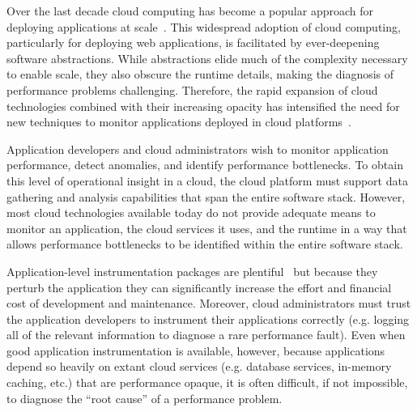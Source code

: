 Over the last decade cloud computing has become a popular approach for
deploying applications at
scale~\cite{Antonopoulos:2010:CCP:1855007,Pinheiro:2014:ACC:2618168.2618188}.
This widespread adoption of cloud computing, particularly for deploying web
applications, is facilitated by ever-deepening software abstractions.  While
abstractions elide much of 
the complexity necessary to enable scale, they also obscure
the runtime details, making the diagnosis of performance
problems challenging.  Therefore, the rapid expansion of cloud technologies
combined with their increasing opacity has intensified the need for new
techniques to monitor applications deployed in cloud
platforms~\cite{DaCunhaRodrigues:2016:MCC:2851613.2851619}. 

Application developers and cloud administrators wish to monitor
application performance, detect anomalies, and identify performance 
bottlenecks. To
obtain this level of operational insight in a cloud,
the cloud platform must support data gathering and analysis capabilities that
span the entire software stack.  However, most cloud technologies
available today do not provide adequate means to monitor an application, the cloud
services it uses, and the runtime in a way that allows performance bottlenecks
to be identified within the entire software stack.

Application-level instrumentation packages are
plentiful~\cite{newrelic,datadog,dynatrace} but because they perturb the
application they can significantly increase the
effort and financial cost of development and maintenance.  Moreover, cloud
administrators must trust the application developers to instrument their
applications correctly (e.g. logging all of the relevant 
information to diagnose a rare performance fault).  Even when good application
instrumentation is available, however, because applications depend 
so heavily on
extant cloud services (e.g. database services, in-memory caching, etc.) that
are performance opaque,
it is often difficult, if not impossible, to diagnose
the ``root cause'' of a performance problem.



